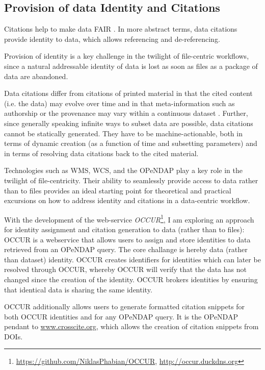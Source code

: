 \documentclass[letterpaper, parskip=half]{scrartcl}
\begin{document}
\newpage

\subsection{Provision of data Identity and Citations}
Citations help to make data \acrfull{FAIR} \citep{Wilkinson2016}. In more abstract terms, data citations provide identity to data, which allows referencing and de-referencing.

Provision of identity is a key challenge in the twilight of file-centric workflows, since a natural addressable identity of data is lost as soon as files as a package of data are abandoned.

Data citations differ from citations of printed material in that the cited content (i.e. the data) may evolve over time and in that meta-information such as authorship or the provenance may vary within a continuous dataset \citep{Buneman2016}. Further, since generally speaking infinite ways to subset data are possible, data citations cannot be statically generated. They have to be machine-actionable, both in terms of dynamic creation (as a function of time and subsetting parameters) and in terms of resolving data citations back to the cited material.

Technologies such as \gls{WMS}, \gls{WCS}, and the \gls{OPeNDAP} \citep{Gallagher2005} play a key role in the twilight of file-centricity. Their ability to seamlessly provide access to data rather than to files provides an ideal starting point for theoretical and practical excursions on how to address identity and citations in a data-centric workflow. 


With the development of the web-service \textit{OCCUR}\footnote{\url{https://github.com/NiklasPhabian/OCCUR}, \url{http://occur.duckdns.org}}, I am exploring an approach for identity assignment and citation generation to data (rather than to files):
\Gls{OCCUR} is a webservice that allows users to assign and store identities to data retrieved from an \gls{OPeNDAP} query. 
The core challange is hereby data (rather than dataset) identity.
OCCUR creates identifiers for identities which can later be resolved through \gls{OCCUR}, whereby \gls{OCCUR} will verify that the data has not changed since the creation of the identity. OCCUR brokers identities by ensuring that identical data is sharing the same identity.

\gls{OCCUR} additionally allows users to generate formatted citation snippets for both OCCUR identities and for any \gls{OPeNDAP} query. It is the \gls{OPeNDAP} pendant to \url{www.crosscite.org}, which allows the creation of citation snippets from \glspl{DOI}. 
\end{document}
